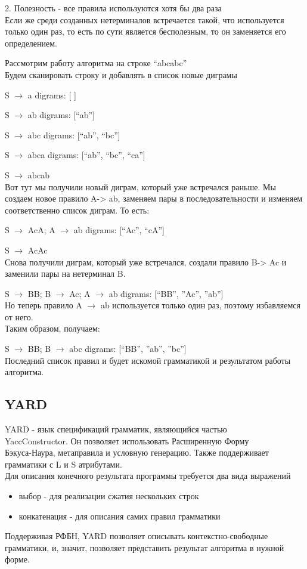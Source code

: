 \documentclass[14pt]{matmex-diploma}
\begin{document}
2. Полезность - все правила используются хотя бы два раза \\ Если же среди созданных нетерминалов встречается такой, что используется только один раз, то есть по сути является бесполезным, то он заменяется его определением.

Рассмотрим работу алгоритма на строке “abcabc” \\ Будем сканировать строку и добавлять в список новые диграмы

S $\rightarrow$ a \tab digrams: [ ]


S $\rightarrow$ ab \tab digrams: [“ab”] 

S $\rightarrow$ abc	\tab digrams: [“ab”, “bc”]


S $\rightarrow$ abca \tab digrams: [“ab”, “bc”, “ca”]


S $\rightarrow$ abcab \\ Вот тут мы получили новый диграм, который уже встречался раньше. Мы создаем новое правило A-> ab, заменяем пары в последовательности и изменяем соответственно список диграм. То есть:

S $\rightarrow$ AcA;  A $\rightarrow$ ab \tab digrams: [“Ac”, “cA”]


S $\rightarrow$ AcAc
\\Снова получили диграм, который уже встречался, создали правило B-> Ac и заменили пары на нетерминал B. 

S $\rightarrow$ BB;   B $\rightarrow$ Ac;   A $\rightarrow$ ab \tab digrams: [“BB”, ”Ac”, ”ab”] \\ Но теперь правило A $\rightarrow$ ab используется только один раз, поэтому избавляемся от него. \\ Таким образом, получаем:

S $\rightarrow$ BB;   B $\rightarrow$ abc \tab digrams: [“BB”, ”ab”, ”bc”]
\\Последний список правил и будет искомой грамматикой и результатом работы алгоритма.

	\subsection{YARD}
	    YARD - язык спецификаций грамматик, являющийся частью \\YaccConstructor. 
	    Он позволяет использовать Расширенную Форму \\Бэкуса-Наура, метаправила и условную генерацию. Также поддерживает грамматики с L и S атрибутами.
	    \\Для описания конечного результата программы требуется два вида выражений \begin{itemize}
	        \item выбор - для реализации сжатия нескольких строк 
	        \item конкатенация - для описания самих правил грамматики
	        \end{itemize}  
	    Поддерживая РФБН, YARD позволяет описывать контекстно-свободные 
	    грамматики, и, значит, позволяет представить результат 
	    алгоритма в нужной форме.
\end{document}
